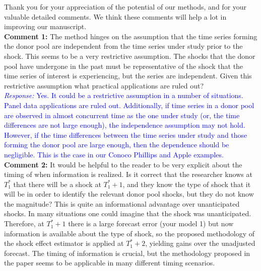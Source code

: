 \documentclass[12pt]{article}
\newcommand{\response}[1]{\noindent \textcolor{blue}{\emph{Response:} #1}}
\begin{document}
{Thank you for your appreciation of the potential of our methods, and for your valuable detailed comments.  We think these comments will help a lot in improving our manuscript.\\

{\bf Comment 1:} The method hinges on the assumption that the time series forming the donor pool are independent from the time series under study prior to the shock. This seems to be a very restrictive assumption. The shocks that the donor pool have undergone in the past must be representative of the shock that the time series of interest is experiencing, but the series are independent. Given this restrictive assumption what practical applications are ruled out? \\

\response{Yes. It could be a restrictive assumption in a number of situations. Panel data applications are ruled out. Additionally, if time series in a donor pool are observed in almost concurrent time as the one under study (or, the time differences are not large enough), the independence assumption may not hold. However, if the time differences between the time series under study and those forming the donor pool are large enough, then the dependence should be negligible. This is the case in our Conoco Phillips and Apple examples.} \\

{\bf Comment 2:} It would be helpful to the reader to be very explicit about the timing of when information is realized. Is it correct that the researcher knows at $T_1^*$ that there will be a shock at $T_1^* + 1$, and they know the type of shock that it will be in order to identify the relevant donor pool shocks, but they do not know the magnitude? This is quite an informational advantage over unanticipated shocks. In many situations one could imagine that the shock was unanticipated. Therefore, at $T_1^* + 1$  there is a large forecast error (your model 1) but now information is available about the type of shock, so the proposed methodology of the shock effect estimator is applied at $T_1^* + 2$, yielding gains over the unadjusted forecast. The timing of information is crucial, but the methodology proposed in the paper seems to be applicable in many different timing scenarios. \\

}
\end{document}
